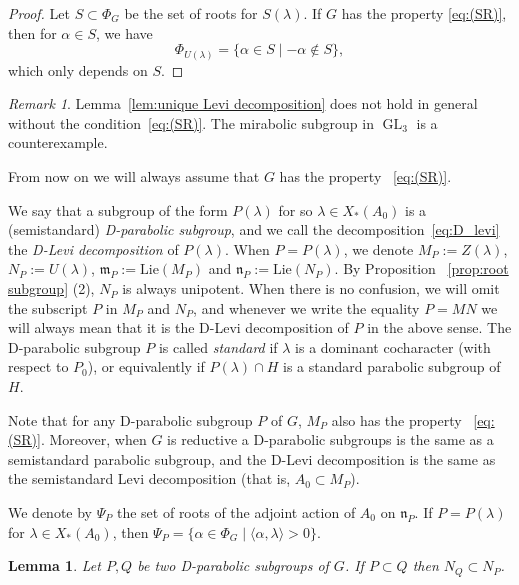 \documentclass[letterpaper,11pt]{amsart}
\newcommand{\fm}{\mathfrak{m}}
\newcommand{\fn}{\mathfrak{n}}
\newcommand{\<}{\negthickspace}
\DeclareMathOperator{\GL}{GL}
\theoremstyle{definition}
\theoremstyle{plain}
\newtheorem{lemma}[definition]{Lemma}
\theoremstyle{remark}
\newtheorem{remark}[definition]{Remark}
\numberwithin{equation}{section}
\begin{document}
\begin{proof}
Let $S \subset \Phi_G$ be the set of roots for $S(\lambda)$. If $G$ has the property \eqref{eq:(SR)}, then for $\alpha \in S$, we have
\begin{equation*}
    \Phi_{U(\lambda)} = \{ \alpha \in S \mid -\alpha \not \in S \},
\end{equation*}
which only depends on $S$.
\end{proof}

\begin{remark}
Lemma~\ref{lem:unique Levi decomposition} does not hold in general without the condition~\eqref{eq:(SR)}. The mirabolic subgroup in $\GL_3$ is a counterexample.
\end{remark}

From now on we will always assume that $G$ has the property ~\eqref{eq:(SR)}.

We say that a subgroup of the form $P(\lambda)$ for so $\lambda \in X_*(A_0)$ is a (semistandard) \emph{D-parabolic
subgroup}, and we call the decomposition~\eqref{eq:D_levi} the \emph{D-Levi
decomposition} of $P(\lambda)$. When $P=P(\lambda)$, we denote $M_P :=
Z(\lambda)$, $N_P:=U(\lambda)$, $\fm_P := \mathrm{Lie}(M_P)$ and
$\fn_P:=\mathrm{Lie}(N_P)$. By Proposition ~\ref{prop:root subgroup} (2),
$N_P$ is always unipotent. When there is no confusion, we will omit
the subscript $P$ in $M_P$ and $N_P$, and whenever we write the equality $P=MN$
we will always mean that it is the D-Levi decomposition of $P$ in the above sense. The D-parabolic
subgroup $P$ is called \emph{standard} if $\lambda$ is a dominant cocharacter
(with respect to $P_0$), or equivalently if $P(\lambda) \cap H$ is a standard
parabolic subgroup of $H$.

Note that for any D-parabolic subgroup $P$ of $G$, $M_P$ also has the property ~\eqref{eq:(SR)}. Moreover, when $G$ is reductive a D-parabolic subgroups is the same as a semistandard parabolic
subgroup, and the D-Levi decomposition is the same as the semistandard Levi
decomposition (that is, $A_0 \subset M_P$).

We denote by $\Psi_P$ the set of roots of the adjoint action of $A_0$ on $\fn_P$.
If $P=P(\lambda)$ for $\lambda \in X_*(A_0)$, then $\Psi_P = \{ \alpha \in \Phi_G \mid \langle \alpha,\lambda \rangle > 0 \}$.

\begin{lemma}
Let $P,Q$ be two D-parabolic subgroups of $G$. If $P \subset Q$ then $N_Q
\subset N_P$.
\end{lemma}
\end{document}
